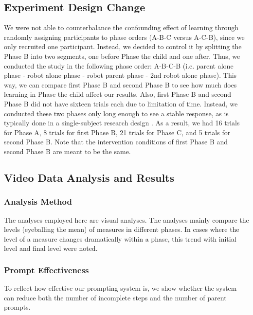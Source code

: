 \subsection{Experiment Design Change}
We were not able to counterbalance the confounding effect of learning through randomly assigning participants to phase orders (A-B-C versus A-C-B), since we only recruited one participant.  Instead, we decided to control it by splitting the Phase B into two segments, one before Phase the child and one after.  Thus, we conducted the study in the following phase order: A-B-C-B (i.e. parent alone phase - robot alone phase - robot parent phase - 2nd robot alone phase).  This way, we can compare first Phase B and second Phase B to see how much does learning in Phase the child affect our results.  Also, first Phase B and second Phase B did not have sixteen trials each due to limitation of time.  Instead, we conducted these two phases only long enough to see a stable response, as is typically done in a single-subject research design \cite{ayres2009acquisition, bereznak2012video}.  As a result, we had 16 trials for Phase A, 8 trials for first Phase B, 21 trials for Phase C, and 5 trials for second Phase B.  Note that the intervention conditions of first Phase B and second Phase B are meant to be the same.


\subsection{Video Data Analysis and Results}
\label{sec:VideoDataAnalysisAndResults}

\subsubsection{Analysis Method}
The analyses employed here are visual analyses.  The analyses mainly compare the levels (eyeballing the mean) of measures in different phases.  In cases where the level of a measure changes dramatically within a phase, this trend with initial level and final level were noted.

\subsubsection{Prompt Effectiveness}
To reflect how effective our prompting system is, we show whether the system can reduce both the number of incomplete steps and the number of parent prompts.

